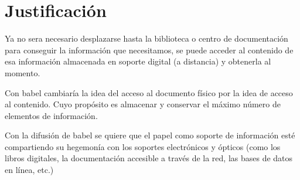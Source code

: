 \documentclass[letter,12pt]{article}
\begin{document}
\section{Justificación}
Ya no sera necesario desplazarse hasta la biblioteca o centro de documentación para conseguir la
información que necesitamos, se puede acceder al contenido de esa información almacenada en soporte
digital (a distancia) y obtenerla al momento.

Con babel cambiaría la idea del acceso al documento físico por la idea de acceso al contenido. Cuyo propósito es almacenar y conservar el máximo número de elementos de información.

Con la difusión de babel se quiere que el papel como soporte de información esté compartiendo su
hegemonía con los soportes electrónicos y ópticos (como los libros digitales, la documentación
accesible a través de la red, las bases de datos en línea, etc.)
\end{document}
